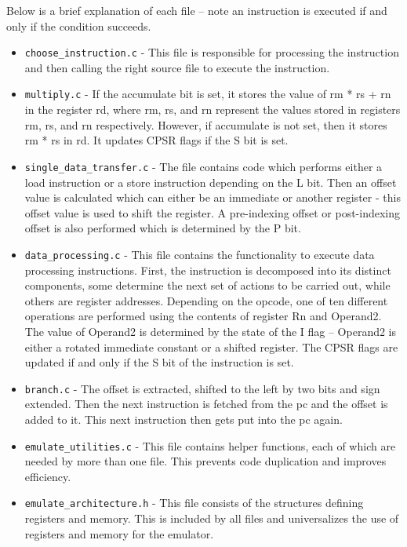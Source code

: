\documentclass[11pt]{article}
\begin{document}
Below is a brief explanation of each file – note an instruction is executed if and only if the condition succeeds. 
\begin{itemize}
    \item \texttt{choose\_instruction.c} - This file is responsible for processing the instruction and then calling the right source file to execute the instruction. 
    \item \texttt{multiply.c} - If the accumulate bit is set, it stores the value of rm * rs + rn in the register rd, where rm, rs, and rn represent the values stored in registers rm, rs, and rn respectively. However, if accumulate is not set, then it stores rm * rs in rd. It updates CPSR flags if the S bit is set. 
    \item \texttt{single\_data\_transfer.c} - The file contains code which performs either a load instruction or a store instruction depending on the L bit. Then an offset value is calculated which can either be an immediate or another register - this offset value is used to shift the register. A pre-indexing offset or post-indexing offset is also performed which is determined by the P bit. 
    \item \texttt{data\_processing.c} - This file contains the functionality to execute data processing instructions. First, the instruction is decomposed into its distinct components, some determine the next set of actions to be carried out, while others are register addresses. Depending on the opcode, one of ten different operations are performed using the contents of register Rn and Operand2. The value of Operand2 is determined by the state of the I flag – Operand2 is either a rotated immediate constant or a shifted register. The CPSR flags are updated if and only if the S bit of the instruction is set. 
    \item \texttt{branch.c} - The offset is extracted, shifted to the left by two bits and sign extended. Then the next instruction is fetched from the pc and the offset is added to it. This next instruction then gets put into the pc again. 
    \item \texttt{emulate\_utilities.c} - This file contains helper functions, each of which are needed by more than one file. This prevents code duplication and improves efficiency.
    \item \texttt{emulate\_architecture.h} - This file consists of the structures defining registers and memory. This is included by all files and universalizes the use of registers and memory for the emulator. 
    
\end{itemize}
\end{document}
